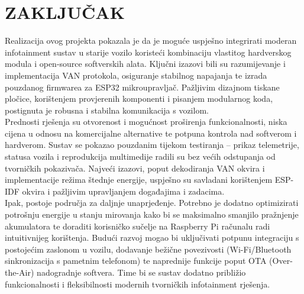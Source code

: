 \newpage

\section{ZAKLJUČAK}

Realizacija ovog projekta pokazala je da je moguće uspješno integrirati moderan infotainment sustav u starije vozilo koristeći kombinaciju vlastitog hardverskog modula i open-source softverskih alata. Ključni izazovi bili su razumijevanje i implementacija VAN protokola, osiguranje stabilnog napajanja te izrada pouzdanog firmwarea za ESP32 mikroupravljač. Pažljivim dizajnom tiskane pločice, korištenjem provjerenih komponenti i pisanjem modularnog koda, postignuta je robusna i stabilna komunikacija s vozilom. \\

Prednosti rješenja su otvorenost i mogućnost proširenja funkcionalnosti, niska cijena u odnosu na komercijalne alternative te potpuna kontrola nad softverom i hardverom. Sustav se pokazao pouzdanim tijekom testiranja – prikaz telemetrije, statusa vozila i reprodukcija multimedije radili su bez većih odstupanja od tvorničkih pokazivača. Najveći izazovi, poput dekodiranja VAN okvira i implementacije režima štednje energije, uspješno su savladani korištenjem ESP-IDF okvira i pažljivim upravljanjem događajima i zadacima.\\

Ipak, postoje područja za daljnje unaprjeđenje. Potrebno je dodatno optimizirati potrošnju energije u stanju mirovanja kako bi se maksimalno smanjilo pražnjenje akumulatora te doraditi korisničko sučelje na Raspberry Pi računalu radi intuitivnijeg korištenja. Budući razvoj mogao bi uključivati potpunu integraciju s postojećim zaslonom u vozilu, dodavanje bežične povezivosti (Wi-Fi/Bluetooth sinkronizacija s pametnim telefonom) te naprednije funkcije poput OTA (Over-the-Air) nadogradnje softvera. Time bi se sustav dodatno približio funkcionalnosti i fleksibilnosti modernih tvorničkih infotainment rješenja.

